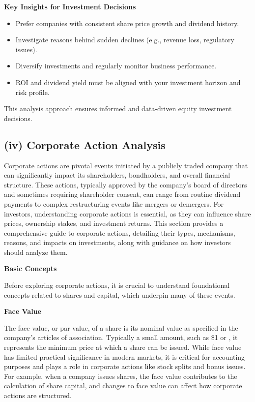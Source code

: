 \documentclass[12pt]{article}
\begin{document}
\textbf{Key Insights for Investment Decisions}
\begin{itemize}
    \item Prefer companies with consistent share price growth and dividend history.
    \item Investigate reasons behind sudden declines (e.g., revenue loss, regulatory issues).
    \item Diversify investments and regularly monitor business performance.
    \item ROI and dividend yield must be aligned with your investment horizon and risk profile.
\end{itemize}

This analysis approach ensures informed and data-driven equity investment decisions.

\subsection*{(iv) Corporate Action Analysis}

Corporate actions are pivotal events initiated by a publicly traded company that can significantly impact its shareholders, bondholders, and overall financial structure. These actions, typically approved by the company's board of directors and sometimes requiring shareholder consent, can range from routine dividend payments to complex restructuring events like mergers or demergers. For investors, understanding corporate actions is essential, as they can influence share prices, ownership stakes, and investment returns. This section provides a comprehensive guide to corporate actions, detailing their types, mechanisms, reasons, and impacts on investments, along with guidance on how investors should analyze them.

\textbf{Basic Concepts}

Before exploring corporate actions, it is crucial to understand foundational concepts related to shares and capital, which underpin many of these events.

\textbf{Face Value}

The face value, or par value, of a share is its nominal value as specified in the company's articles of association. Typically a small amount, such as \$1 or , it represents the minimum price at which a share can be issued. While face value has limited practical significance in modern markets, it is critical for accounting purposes and plays a role in corporate actions like stock splits and bonus issues. For example, when a company issues shares, the face value contributes to the calculation of share capital, and changes to face value can affect how corporate actions are structured.
\end{document}
